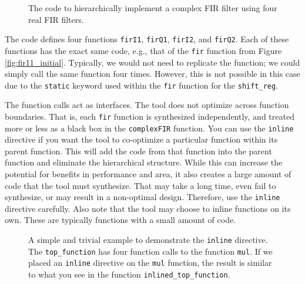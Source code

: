 \begin{figure}

\caption{The \VHLS code to hierarchically implement a complex FIR filter using four real FIR filters.}
\label{fig:complex_fir_code}
\end{figure}

The code defines four functions \lstinline{firI1}, \lstinline{firQ1}, \lstinline{firI2}, and \lstinline{firQ2}. Each of these functions has the exact same code, e.g., that of the \lstinline{fir} function from Figure \ref{fig:fir11_initial}. Typically, we would not need to replicate the function; we could simply call the same function four times. However, this is not possible in this case due to the \lstinline{static} keyword used within the \lstinline{fir} function for the \lstinline{shift_reg}. 

The function calls act as interfaces. The \VHLS tool does not optimize across function boundaries. That is, each \lstinline{fir} function is synthesized independently, and treated more or less as a black box in the \lstinline{complexFIR} function. You can use the \lstinline{inline} directive if you want the \VHLS tool to co-optimize a particular function within its parent function. This will add the code from that function into the parent function and eliminate the hierarchical structure. While this can increase the potential for benefits in performance and area, it also creates a large amount of code that the tool must synthesize. That may take a long time, even fail to synthesize, or may result in a non-optimal design. Therefore, use the \lstinline{inline} directive carefully. Also note that the \VHLS tool may choose to inline functions on its own. These are typically functions with a small amount of code.

\begin{figure}

\caption{ A simple and trivial example to demonstrate the \lstinline{inline} directive. The \lstinline{top_function} has four function calls to the function \lstinline{mul}. If we placed an \lstinline{inline} directive on the \lstinline{mul} function, the result is similar to what you see in the function \lstinline{inlined_top_function}. }
\label{fig:inline}
\end{figure}

